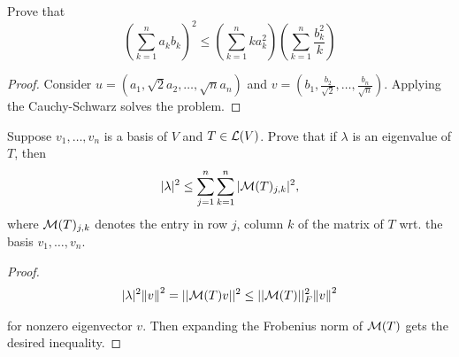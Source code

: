 \documentclass{extarticle}
\begin{document}
\begin{problem}{17}
    Prove that 
    \[\left(\sum_{k=1}^{n} a_k b_k \right)^2 \leq \left(\sum_{k=1}^{n} k a_k^2\right) \left(\sum_{k=1}^{n} \frac{b_k^2}{k}\right)\]
\end{problem}

\begin{proof}
Consider \(u = (a_1, \sqrt{2}a_2, \ldots, \sqrt{n}a_n)\) and 
\(v = \left(b_1, \frac{b_2}{\sqrt{2}}, \ldots, \frac{b_n}{\sqrt{n}}\right)\). Applying the Cauchy-Schwarz solves the problem.
\end{proof}

        


\begin{problem}{19}
    Suppose \(v_1, \ldots, v_n\) is a basis of \(V\) and \(T \in \mathcal{L}(V)\). Prove that 
    if \(\lambda\) is an eigenvalue of \(T\), then 
    \[|\lambda|^2 \leq \sum_{j=1}^{n} \sum_{k=1}^{n} |\mathcal{M}(T)_{j,k}|^2,\]
    where \(\mathcal{M}(T)_{j,k}\) denotes the entry in row \(j\), column \(k\) of the matrix of \(T\) 
    wrt. the basis \(v_1, \ldots, v_n\).
\end{problem}

\begin{proof}


\begin{align*}
    |\lambda|^2 \norm{v}^2 = || \mathcal{M}(T) v ||^2 \leq || \mathcal{M}(T) ||_F^2 \norm{v}^2 
\end{align*}

for nonzero eigenvector \(v\). Then expanding the Frobenius norm of \(\mathcal{M}(T)\) gets the desired inequality.
\end{proof}
\end{document}
